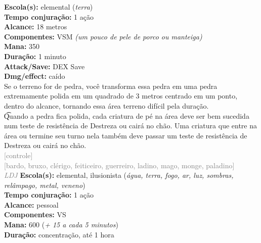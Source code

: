 \documentclass{RPG_Adventure}[2021/10/20]
\begin{document}
{\small \t \textbf{Escola(s):} elemental (\textit{terra})\\\t \textbf{Tempo conjuração:} 1 ação\\\t \textbf{Alcance:} 18 metros\\\t \textbf{Componentes:} VSM \textit{(um pouco de pele de porco ou manteiga)}\\\t \textbf{Mana:} 350\\\t \textbf{Duração:} 1 minuto\\\t \textbf{Attack/Save:} DEX Save\\\t \textbf{Dmg/effect:} caído\\}
{\normalsize Se o terreno for de pedra, você transforma essa pedra em uma pedra extremamente polida em um quadrado de 3 metros centrado em um ponto, dentro do alcance, tornando essa área terreno difícil pela duração.\\\t Quando a pedra fica polida, cada criatura de pé na área deve ser bem sucedida num teste de resistência de Destreza ou cairá no chão. Uma criatura que entre na área ou termine seu turno nela também deve passar um teste de resistência de Destreza ou cairá no chão.\\}
{\scriptsize \textcolor{gray}{[controle]\\}}
{\scriptsize \textcolor{gray}{[bardo, bruxo, clérigo, feiticeiro, guerreiro, ladino, mago, monge, paladino]\\}}
{\tiny \textcolor{gray}{\textit{LDJ}}}\jump{}
{\small \t \textbf{Escola(s):} elemental, ilusionista (\textit{água, terra, fogo, ar, luz, sombras, relâmpago, metal, veneno})\\\t \textbf{Tempo conjuração:} 1 ação\\\t \textbf{Alcance:} pessoal\\\t \textbf{Componentes:} VS\\\t \textbf{Mana:} 600 (\textit{+ 15 a cada 5 minutos})\\\t \textbf{Duração:} concentração, até 1 hora\\}
\end{document}
